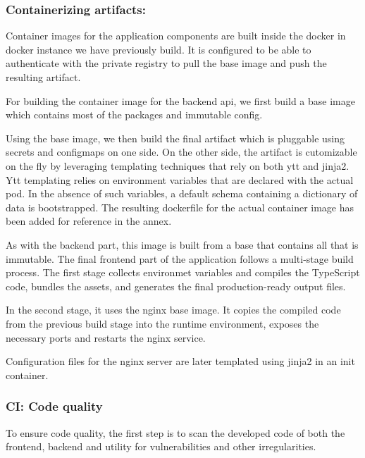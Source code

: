 \subsubsection{Containerizing artifacts:}

Container images for the application components are built inside the docker in docker instance we have previously build. It is configured to be able to authenticate with the private registry to pull the base image and push the resulting artifact. 


For building the container image for the backend api, we first build a base image which contains most of the packages and immutable config. 

Using the base image, we then build the final artifact which is pluggable using secrets and configmaps on one side. On the other side, the artifact is cutomizable on the fly by leveraging templating techniques that rely on both ytt and jinja2. Ytt templating relies on environment variables that are declared with the actual pod. In the absence of such variables, a default schema containing a dictionary of data is bootstrapped.
The resulting dockerfile for the actual container image has been added for reference in the annex. 


As with the backend part, this image is built from a base that contains all that is immutable. The final frontend part of the application follows a multi-stage build process. The first stage collects environmet variables and compiles the TypeScript code, bundles the assets, and generates the final production-ready output files.

In the second stage, it uses the nginx base image. It copies the compiled code from the previous build stage into the runtime environment, exposes the necessary ports and restarts the nginx service.

Configuration files for the nginx server are later templated using jinja2 in an init container.

\newpage

\subsubsection{CI: Code quality }

To ensure code quality, the first step is to scan the developed code of both the frontend, backend and utility for vulnerabilities and other irregularities.  

